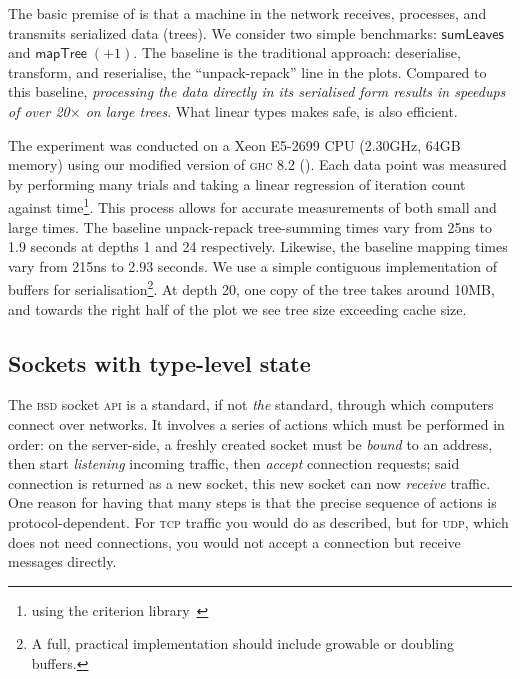 \documentclass[acmsmall,screen]{acmart}\settopmatter{}
\newcommand{\Varid}[1]{\mathit{#1}}
\renewcommand\Varid[1]{\mathord{\textsf{#1}}}
\newcommand{\ghc}{\textsc{ghc}\xspace}
\begin{document}
The basic premise of  is that a machine in the network
receives, processes, and transmits serialized data (trees).
%
We consider two simple benchmarks: \ensuremath{\Varid{sumLeaves}} and \ensuremath{\Varid{mapTree}\;(\mathbin{+}\mathrm{1})}.
The baseline is the traditional approach: deserialise, transform, and reserialise,
the ``unpack-repack'' line in the plots.  Compared to this baseline,
{\em processing the data directly in its serialised form results in speedups of over
20$\times$ on large trees}.
%
What linear types makes safe, is also efficient.

The experiment was conducted on a Xeon E5-2699 CPU (2.30GHz, 64GB memory) using
our modified version of \ghc{} 8.2 ().  Each
data point was measured by performing many trials and taking a linear regression
of iteration count against time\footnote{using the criterion library~\cite{osullivan_criterion_2013}}.
%
This process allows for accurate measurements of both small and large times.  The
baseline unpack-repack tree-summing times vary from 25ns to 1.9 seconds at
depths 1 and 24 respectively.  Likewise, the baseline mapping times vary from
215ns to 2.93 seconds.
%
We use a simple contiguous implementation of buffers for
serialisation\footnote{A full, practical implementation should include growable
  or doubling buffers.}.
%
At depth 20, one copy of the tree takes around 10MB, and towards the right half
of the plot we see tree size exceeding cache size.

\subsection{Sockets with type-level state}
\label{sec:sockets}

The \textsc{bsd} socket \textsc{api} is a standard, if not \emph{the}
standard, through which computers connect over networks. It involves a
series of actions which must be performed in order: on the
server-side, a freshly created socket must be \emph{bound} to an
address, then start \emph{listening} incoming traffic, then
\emph{accept} connection requests; said connection is returned as a
new socket, this new socket can now \emph{receive} traffic. One reason
for having that many steps is that the precise sequence of
actions is protocol-dependent. For \textsc{tcp} traffic you would do as
described, but for \textsc{udp}, which does not need connections, you
would not accept a connection but receive messages directly.
\end{document}
